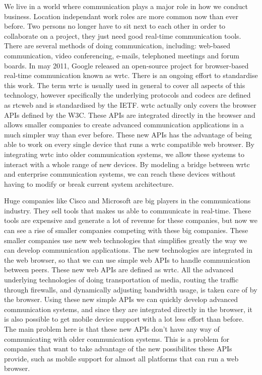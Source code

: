 We live in a world where communication plays a major role in how we conduct business. Location independant work roles are more common now than ever before. Two persons no longer have to sit next to each other in order to collaborate on a project, they just need good real-time communication tools. There are several methods of doing communication, including: web-based communication, video conferencing, e-mails, telephoned meetings and forum boards. In may 2011, Google released an open-source project for browser-based real-time communication known as \gls{wrtc}\cite{google-release-of-webrtc}. There is an ongoing effort to standardise this work. The term \gls{wrtc} is usually used in general to cover all aspects of this technology, however specifically the underlying protocols and codecs are defined as \gls{rtcweb} and is standardised by the IETF\cite{ietf}. \gls{wrtc} actually only covers the browser APIs defined by the W3C\cite{w3c}. These APIs are integrated directly in the browser and allows smaller companies to create advanced communication applications in a much simpler way than ever before. These new APIs has the advantage of being able to work on every single device that runs a \gls{wrtc} compatible web browser. By integrating \gls{wrtc} into older communication systems, we allow these systems to interact with a whole range of new devices. By modeling a bridge between \gls{wrtc} and enterprise communication systems, we can reach these devices without having to modify or break current system architecture.

Huge companies like Cisco and Microsoft are big players in the communications industry. They sell tools that makes us able to communicate in real-time. These tools are expensive and generate a lot of revenue for these companies, but now we can see a rise of smaller companies competing with these big companies. These smaller companies use new web technologies that simplifies greatly the way we can develop communication applications. The new technologies are integrated in the web browser, so that we can use simple web APIs to handle communication between peers. These new web APIs are defined as \gls{wrtc}. All the advanced underlying technologies of doing transportation of media, routing the traffic through firewalls, and dynamically adjusting bandwidth usage, is taken care of by the browser. Using these new simple APIs we can quickly develop advanced communication systems, and since they are integrated directly in the browser, it is also possible to get mobile device support with a lot less effort than before. The main problem here is that these new APIs don't have any way of communicating with older communication systems. This is a problem for companies that want to take advantage of the new possibilites these APIs provide, such as mobile support for almost all platforms that can run a web browser.

